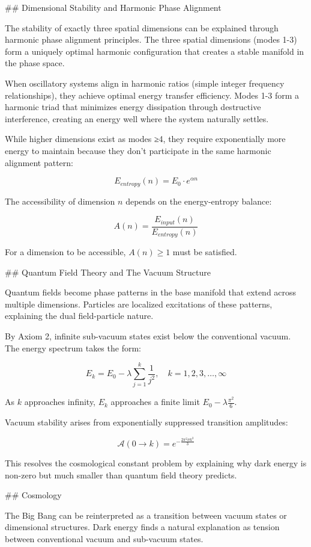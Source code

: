 ## Dimensional Stability and Harmonic Phase Alignment

The stability of exactly three spatial dimensions can be explained through harmonic phase alignment principles. The three spatial dimensions (modes 1-3) form a uniquely optimal harmonic configuration that creates a stable manifold in the phase space.

When oscillatory systems align in harmonic ratios (simple integer frequency relationships), they achieve optimal energy transfer efficiency. Modes 1-3 form a harmonic triad that minimizes energy dissipation through destructive interference, creating an energy well where the system naturally settles.

While higher dimensions exist as modes ≥4, they require exponentially more energy to maintain because they don't participate in the same harmonic alignment pattern:

$$E_{entropy}(n) = E_0 \cdot e^{\alpha n}$$

The accessibility of dimension $n$ depends on the energy-entropy balance:

$$A(n) = \frac{E_{input}(n)}{E_{entropy}(n)}$$

For a dimension to be accessible, $A(n) \geq 1$ must be satisfied.

## Quantum Field Theory and The Vacuum Structure

Quantum fields become phase patterns in the base manifold that extend across multiple dimensions. Particles are localized excitations of these patterns, explaining the dual field-particle nature.

By Axiom 2, infinite sub-vacuum states exist below the conventional vacuum. The energy spectrum takes the form:

$$E_k = E_0 - \lambda\sum_{j=1}^{k}\frac{1}{j^2}, \quad k = 1, 2, 3, \ldots, \infty$$

As $k$ approaches infinity, $E_k$ approaches a finite limit $E_0 - \lambda\frac{\pi^2}{6}$.

Vacuum stability arises from exponentially suppressed transition amplitudes:

$$\mathcal{A}(0 \rightarrow k) = e^{-\frac{2\pi^2\sigma k^3}{3}}$$

This resolves the cosmological constant problem by explaining why dark energy is non-zero but much smaller than quantum field theory predicts.

## Cosmology

The Big Bang can be reinterpreted as a transition between vacuum states or dimensional structures. Dark energy finds a natural explanation as tension between conventional vacuum and sub-vacuum states.

